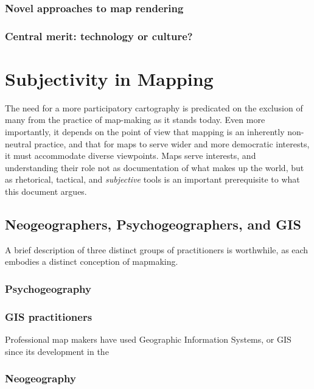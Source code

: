 \documentclass[11pt]{report}
\begin{document}
\subsection{Novel approaches to map rendering}
\subsection{Central merit: technology or culture?}

\chapter{Subjectivity in Mapping}


The need for a more participatory cartography is predicated on the exclusion of many from the practice of map-making as it stands today. Even more importantly, it depends on the point of view that mapping is an inherently non-neutral practice, and that for maps to serve wider and more democratic interests, it must accommodate diverse viewpoints. Maps serve interests, and understanding their role not as documentation of what makes up the world, but as rhetorical, tactical, and \emph{subjective} tools is an important prerequisite to what this document argues.

\section{Neogeographers, Psychogeographers, and GIS}

A brief description of three distinct groups of practitioners is worthwhile, as each embodies a distinct conception of mapmaking. 

\subsection{Psychogeography}

\subsection{GIS practitioners}

Professional map makers have used Geographic Information Systems, or GIS since its development in the 

\subsection{Neogeography}
\end{document}
